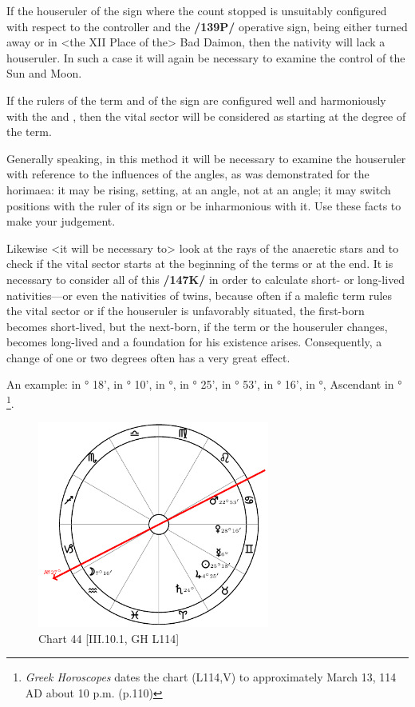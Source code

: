 If the houseruler of the sign where the count stopped is unsuitably configured with respect to the controller and
the \textbf{/139P/} operative sign, being either turned away or in <the XII Place of the> Bad Daimon, then the nativity will lack a houseruler. In such a case it will again be necessary to examine the control of the Sun and Moon. 

If the rulers of the term and of the sign are configured well and harmoniously with the \Sun\xspace and \Moon, then the vital sector will be considered as starting at the degree of the term.

Generally speaking, in this method it will be necessary to examine the houseruler with reference to the influences of the angles, as was demonstrated for the horimaea: it may be rising, setting, at an angle, not at an angle; it may switch positions with the ruler of its sign or be inharmonious with it. Use these facts to make your judgement. 

Likewise <it will be necessary to> look at the rays of the anaeretic stars and to check if the vital sector starts at the beginning of the terms or at the end. It is necessary to consider all of this \textbf{/147K/} in order to calculate short- or long-lived nativities—or even the nativities of twins, because often if a malefic term rules the vital sector or if the houseruler is unfavorably situated, the first-born
becomes short-lived, but the next-born, if the term or the houseruler changes, becomes long-lived and a foundation for his existence arises. Consequently, a change of one or two degrees often has a very great effect.

An example: \Sun\xspace in \Taurus\xspace 25° 18', \Moon\xspace in \Aquarius\xspace 7° 10', \Saturn\xspace in \Aries\xspace 24°, \Jupiter\xspace in \Taurus\xspace 4° 25', \Mars\xspace in \Cancer\xspace 22° 53', \Venus\xspace in \Gemini\xspace 28° 16', \Mercury\xspace in \Gemini\xspace 6°, Ascendant in \Capricorn\xspace 27°
\footnote{\textit{Greek Horoscopes} dates the chart (L114,V) to approximately March 13, 114 AD about 10 p.m. (p.110)}. 

\clearpage
\begin{figure}
\centering
\vspace{-20pt}
\includegraphics[width=0.68\textwidth]{charts/3_10_1}
\caption{Chart 44 [III.10.1, GH L114]}
\label{fig:chart44}
\end{figure} 


